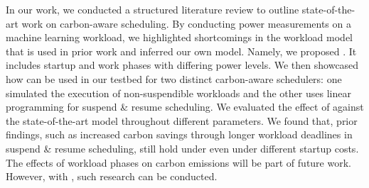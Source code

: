 In our work, we conducted a structured literature review to outline state-of-the-art work on carbon-aware scheduling.
By conducting power measurements on a machine learning workload, we highlighted shortcomings in the workload model that is used in prior work and inferred our own model.
Namely, we proposed \modelname{}. 
It includes startup and work phases with differing power levels.
We then showcased how \modelname{} can be used in our testbed \programname for two distinct carbon-aware schedulers:
one simulated the execution of non-suspendible workloads and the other uses linear programming for suspend \& resume scheduling.
We evaluated the effect of \modelname{} against the state-of-the-art model throughout different parameters.
We found that, prior findings, such as increased carbon savings through longer workload deadlines in suspend \& resume scheduling, still hold under \modelname{} even under different startup costs.
The effects of workload phases on carbon emissions will be part of future work. 
However, with \programname{}, such research can be conducted.